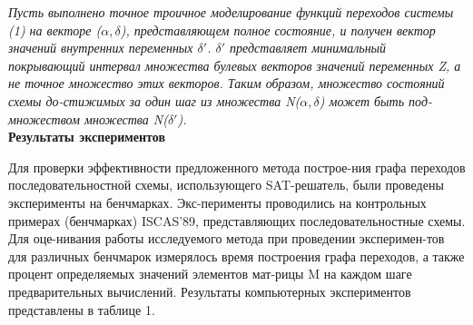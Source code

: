 \documentclass[a4paper, 14pt]{article}
\begin{document}
\textit{Пусть выполнено точное троичное моделирование функций переходов системы (1) на векторе ($\alpha,\delta$), представляющем полное состояние, и получен вектор значений внутренних переменных $\delta'$. $\delta'$ представляет минимальный покрывающий интервал множества булевых векторов значений переменных Z, а не точное множество этих векторов. Таким образом, множество состояний схемы до-стижимых за один шаг из множества N($\alpha,\delta$) может быть под-множеством множества N($\delta'$). 
}\\


\textbf{Результаты экспериментов}

Для проверки эффективности предложенного метода построе-ния графа переходов последовательностной схемы, использующего SAT-решатель, были проведены эксперименты на бенчмарках. Экс-перименты проводились на контрольных примерах (бенчмарках) ISCAS’89, представляющих последовательностные схемы. Для оце-нивания работы исследуемого метода при проведении эксперимен-тов для различных бенчмарок измерялось время построения графа переходов, а также процент определяемых значений элементов мат-рицы M на каждом шаге предварительных вычислений. Результаты компьютерных экспериментов представлены в таблице 1. 
\end{document}
